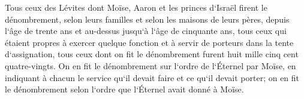 \verse Tous ceux des Lévites dont Moïse, Aaron et les princes d`Israël firent le dénombrement, selon leurs familles et selon les maisons de leurs pères, 
\verse depuis l`âge de trente ans et au-dessus jusqu`à l`âge de cinquante ans, tous ceux qui étaient propres à exercer quelque fonction et à servir de porteurs dans la tente d`assignation, 
\verse tous ceux dont on fit le dénombrement furent huit mille cinq cent quatre-vingts. 
\verse On en fit le dénombrement sur l`ordre de l`Éternel par Moïse, en indiquant à chacun le service qu`il devait faire et ce qu`il devait porter; on en fit le dénombrement selon l`ordre que l`Éternel avait donné à Moïse. 

\chapter{}

